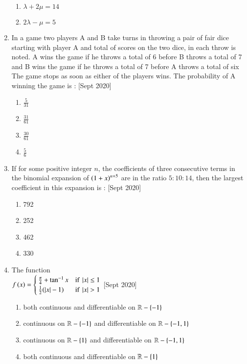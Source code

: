 \documentclass[journal]{IEEEtran}
\begin{document}
\begin{enumerate}
\begin{enumerate}
			\item $\lambda + 2\mu = 14$
			\item $2\lambda - \mu = 5$
		\end{enumerate}
	\item 
	In a game two players A and B take turns in throwing a pair of fair dice starting with player A and total of scores on the two dice, in each throw is noted. A wins the game if he throws a total of 6 before B throws a total of 7 and B wins the game if he throws a total of 7 before A throws a total of six The game stops as soon as either of the players wins. The probability of A winning the game is :
	\hfill [Sept 2020]
		\begin{enumerate}
			\item $\frac{5}{31}$
			\item $\frac{31}{61}$
			\item $\frac{30}{61}$
			\item $\frac{5}{6}$
		\end{enumerate}
	\item
	If for some positive integer $n$, the coefficients of three consecutive terms in the binomial expansion of $\left(1+x\right)^{n+5}$ are in the ratio $5:10:14$, then the largest coefficient in this expansion is :
	\hfill [Sept 2020]
		\begin{enumerate}
			\item 792
			\item 252
			\item 462
			\item 330
		\end{enumerate}
	\item
	The function \\
	$f\left(x\right) =
	\begin{cases}
    		\frac{\pi}{4} + \tan^{-1}{x} & \text{if } \left\vert x\right\vert \leq 1 \\
    		\frac{1}{2}(\left\vert x\right\vert-1) & \text{if } \left\vert x\right\vert > 1
	\end{cases}
	$
	\hfill [Sept 2020]
		\begin{enumerate}
			\item  both continuous and differentiable on $\mathbb{R}-\left\{-1\right\}$
			\item continuous on $\mathbb{R}-\left\{-1\right\}$ and differentiable on $\mathbb{R}-\left\{-1,1\right\}$
			\item continuous on $\mathbb{R}-\left\{1\right\}$ and differentiable on $\mathbb{R}-\left\{-1,1\right\}$
			\item both continuous and differentiable on $\mathbb{R}-\left\{1\right\}$

\end{enumerate}
\end{enumerate}
\end{document}
